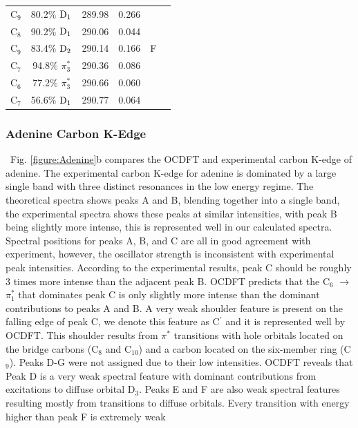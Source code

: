 \documentclass[8.5pt,twoside,twocolumn]{article}
\begin{document}
\begin{table}[!ht]
\begin{tabular*}{8.5cm}{@{\extracolsep{\fill} }cccccc}
    C$_9$
 &   80.2$\%$ $\rm D_1$  & 289.98 & 0.266 & \multirow{5}{*}{F} \\
    C$_8$
 &   90.2$\%$ $\rm D_1$  & 290.06 & 0.044 \\
    C$_9$
 &   83.4$\%$ $\rm D_2$  & 290.14 & 0.166
 \vspace{0.05in}\\
    C$_7$
 &   94.8$\%$ $\pi_3^*$  & 290.36 & 0.086  & \multirow{3}{*}{G} \\
    C$_6$
 &   77.2$\%$ $\pi_3^*$  & 290.66 & 0.060 \\
    C$_7$
 &   56.6$\%$ $\rm D_1$  & 290.77 & 0.064 \\
 \hline
 \hline
   \end{tabular*}
 \label{fig: adenine_k_nitrogen}
 \end{table}
\subsubsection{Adenine Carbon K-Edge}
\ Fig. \ref{figure:Adenine}b compares the OCDFT and experimental carbon K-edge of adenine. The experimental carbon K-edge for adenine is dominated by a large single band with three distinct resonances in the low energy regime. The theoretical spectra shows peaks A and B, blending together into a single band, the experimental spectra shows these peaks at similar intensities, with peak B being slightly more intense, this is represented well in our calculated spectra. Spectral positions for peaks A, B, and C are all in good agreement with experiment, 
however, the oscillator strength is inconsistent with experimental peak intensities. According to the experimental results, peak C should be roughly 3 times more intense than the adjacent peak B. OCDFT predicts that the C$_6$ $\rightarrow$ $\pi^*_1$ that dominates peak C is only slightly more intense than the dominant contributions to peaks A and B. A very weak shoulder feature is present on the falling edge of peak C, we denote this feature as C$^{\prime}$ and it is represented well by OCDFT. This shoulder results from $\pi^*$ transitions with hole orbitals located on the bridge carbons (C$_8$ and C$_{10}$) and a carbon located on the six-member ring (C$_9$). Peaks D-G were not assigned due to their low intensities. OCDFT reveals that Peak D is a very weak spectral feature with dominant contributions from excitations to diffuse orbital D$_3$. Peaks E and F are also weak spectral features resulting mostly from transitions to diffuse orbitals. Every transition with energy higher than peak F is extremely weak 
\end{document}
